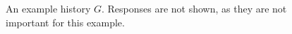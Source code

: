 \begin{figure}[ht]
  \caption{%
    An example history $G$. Responses are not shown, as they are not important
    for this example.
  }
\end{figure}
